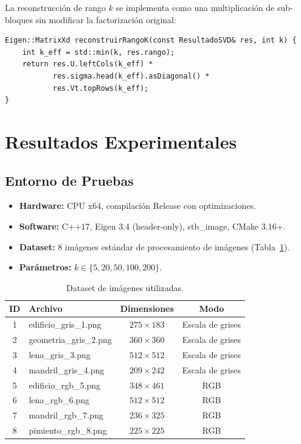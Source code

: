 ﻿\documentclass[12pt,a4paper]{article}
\theoremstyle{definition}
\begin{document}
La reconstrucci\'{o}n de rango $k$ se implementa como una multiplicaci\'{o}n de sub-bloques sin modificar la factorizaci\'{o}n original:

\begin{lstlisting}[caption={Reconstruccion de rango k (src/svd\_procesador.cpp).}]
Eigen::MatrixXd reconstruirRangoK(const ResultadoSVD& res, int k) {
    int k_eff = std::min(k, res.rango);
    return res.U.leftCols(k_eff) * 
           res.sigma.head(k_eff).asDiagonal() * 
           res.Vt.topRows(k_eff);
}
\end{lstlisting}

\section{Resultados Experimentales}\label{sec:resultados}

\subsection{Entorno de Pruebas}

\begin{itemize}
    \item \textbf{Hardware:} CPU x64, compilaci\'{o}n Release con optimizaciones.
    \item \textbf{Software:} C++17, Eigen 3.4 (header-only), stb\_image, CMake 3.16+.
    \item \textbf{Dataset:} 8 im\'{a}genes est\'{a}ndar de procesamiento de im\'{a}genes (Tabla~\ref{tab:dataset}).
    \item \textbf{Par\'{a}metros:} $k \in \{5, 20, 50, 100, 200\}$.
\end{itemize}

\begin{table}[H]
\centering
\caption{Dataset de im\'{a}genes utilizadas.}
\label{tab:dataset}
\begin{tabular}{@{}clcc@{}}
\toprule
\textbf{ID} & \textbf{Archivo} & \textbf{Dimensiones} & \textbf{Modo} \\
\midrule
1 & edificio\_gris\_1.png & $275 \times 183$ & Escala de grises \\
2 & geometria\_gris\_2.png & $360 \times 360$ & Escala de grises \\
3 & lena\_gris\_3.png & $512 \times 512$ & Escala de grises \\
4 & mandril\_gris\_4.png & $209 \times 242$ & Escala de grises \\
5 & edificio\_rgb\_5.png & $348 \times 461$ & RGB \\
6 & lena\_rgb\_6.png & $512 \times 512$ & RGB \\
7 & mandril\_rgb\_7.png & $236 \times 325$ & RGB \\
8 & pimiento\_rgb\_8.png & $225 \times 225$ & RGB \\
\bottomrule
\end{tabular}
\end{table}
\end{document}
